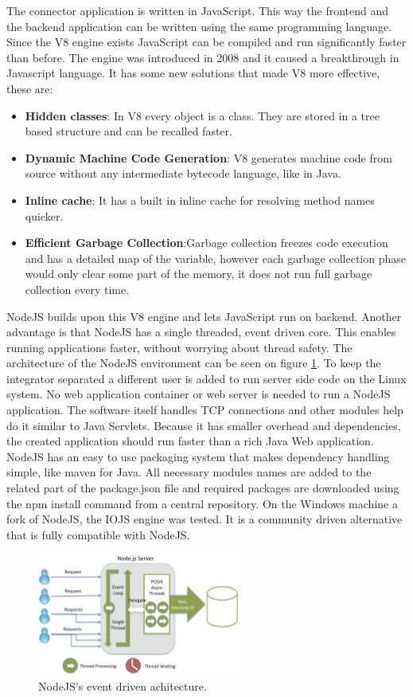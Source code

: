 The connector application is written in JavaScript. This way the frontend and the backend application can be written using the same programming language. 
Since the V8 engine exists JavaScript can be compiled and run significantly faster\cite{v8} than before. 
The engine was introduced in 2008 and it caused a breakthrough in Javascript language. It has some new solutions that made V8 more effective, these are:
\begin{itemize}
\item \textbf{Hidden classes}: In V8 every object is a class. They are stored in a tree based structure and can be recalled faster.
\item \textbf{Dynamic Machine Code Generation}: V8 generates machine code from source without any intermediate bytecode language, like in Java.
\item \textbf{Inline cache}: It has a built in inline cache for resolving method names quicker.
\item \textbf{Efficient Garbage Collection}:Garbage collection freezes code execution and has a detailed map of the variable, however each garbage collection phase would only clear some part of the memory, it does not run full garbage collection every time.
\end{itemize}
NodeJS builds upon this V8 engine and lets JavaScript run on backend. Another advantage is that NodeJS has a single threaded, event driven core. This enables running applications faster, without worrying about thread safety. The architecture of the NodeJS environment can be seen on figure \ref{fig:node}. 
To keep the integrator separated a different user is added to run server side code on the Linux system. 
No web application container or web server is needed to run a NodeJS application. 
The software itself handles TCP connections and other modules help do it similar to Java Servlets. 
Because it has smaller overhead and dependencies, the created application should run faster than a rich Java Web application. 
NodeJS has an easy to use packaging system that makes dependency handling simple, like maven for Java. All necessary modules names are added to the related part of the package.json file and required packages are downloaded using the npm install command from a central repository. On the Windows machine a fork of NodeJS, the IOJS engine was tested. It is a community driven alternative that is fully compatible with NodeJS.
 
\begin{figure}[h]
\centering
\includegraphics[width=0.6\textwidth]{figures/node.png}
\caption{NodeJS's event driven achitecture.\label{fig:node}}
\end{figure}


